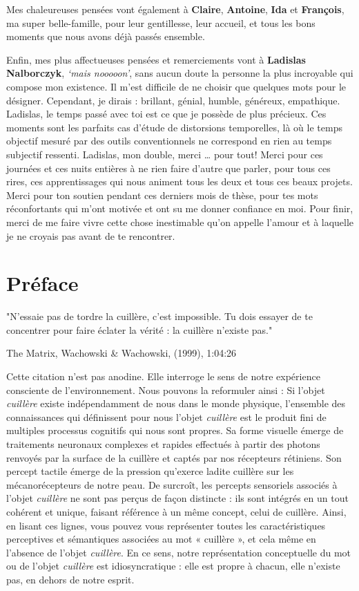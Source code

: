 \documentclass[
  a4paper,12pt,twoside,onecolumn,openright,final,oldfontcommands]{memoir}
\newcommand{\initial}[1]{
	\lettrine[lines=3,lhang=0.33,nindent=0em]{
		\color{gray}
     		{\textsc{#1}}}{}}
\newcommand\blankpage{%
    \null
    \thispagestyle{empty}%
    \newpage
    }
\begin{document}
Mes chaleureuses pensées vont également à \textbf{Claire}, \textbf{Antoine}, \textbf{Ida} et \textbf{François}, ma super belle-famille, pour leur gentillesse, leur accueil, et tous les bons moments que nous avons déjà passés ensemble.

Enfin, mes plus affectueuses pensées et remerciements vont à \textbf{Ladislas Nalborczyk}, \emph{`mais nooooon'}, sans aucun doute la personne la plus incroyable qui compose mon existence. Il m'est difficile de ne choisir que quelques mots pour le désigner. Cependant, je dirais : brillant, génial, humble, généreux, empathique. Ladislas, le temps passé avec toi est ce que je possède de plus précieux. Ces moments sont les parfaits cas d'étude de distorsions temporelles, là où le temps objectif mesuré par des outils conventionnels ne correspond en rien au temps subjectif ressenti. Ladislas, mon double, merci \ldots{} pour tout! Merci pour ces journées et ces nuits entières à ne rien faire d'autre que parler, pour tous ces rires, ces apprentissages qui nous animent tous les deux et tous ces beaux projets. Merci pour ton soutien pendant ces derniers mois de thèse, pour tes mots réconfortants qui m'ont motivée et ont su me donner confiance en moi. Pour finir, merci de me faire vivre cette chose inestimable qu'on appelle l'amour et à laquelle je ne croyais pas avant de te rencontrer.

\afterpage{\blankpage}

\chapter*{Préface}

\sloppy 

\epigraph{"N'essaie pas de tordre la cuillère, c'est impossible. Tu dois essayer de te concentrer pour faire éclater la vérité : la cuillère n’existe pas."}{The Matrix, Wachowski \& Wachowski, (1999), 1:04:26}

\initial{C}ette citation n'est pas anodine. Elle interroge le sens de notre expérience consciente de l'environnement. Nous pouvons la reformuler ainsi : Si l'objet \emph{cuillère} existe indépendamment de nous dans le monde physique, l'ensemble des connaissances qui définissent pour nous l'objet \emph{cuillère} est le produit fini de multiples processus cognitifs qui nous sont propres. Sa forme visuelle émerge de traitements neuronaux complexes et rapides effectués à partir des photons renvoyés par la surface de la cuillère et captés par nos récepteurs rétiniens. Son percept tactile émerge de la pression qu'exerce ladite cuillère sur les mécanorécepteurs de notre peau. De surcroît, les percepts sensoriels associés à l'objet \emph{cuillère} ne sont pas perçus de façon distincte : ils sont intégrés en un tout cohérent et unique, faisant référence à un même concept, celui de cuillère. Ainsi, en lisant ces lignes, vous pouvez vous représenter toutes les caractéristiques perceptives et sémantiques associées au mot « cuillère », et cela même en l'absence de l'objet \emph{cuillère}. En ce sens, notre représentation conceptuelle du mot ou de l'objet \emph{cuillère} est idiosyncratique : elle est propre à chacun, elle n'existe pas, en dehors de notre esprit.
\end{document}
